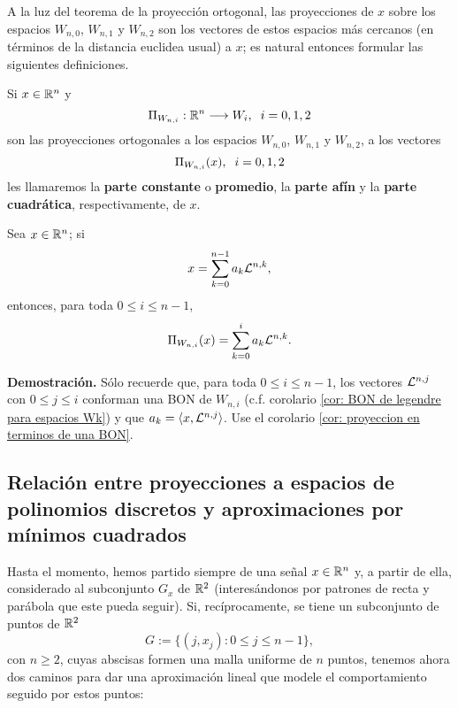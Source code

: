 \noindent A la luz del teorema de la proyección ortogonal, 
las proyecciones de $x$ sobre los espacios 
$W_{n,0}$, $W_{n,1}$
y $W_{n,2}$ son los vectores
de estos espacios más cercanos (en términos de la 
distancia euclidea usual)
a $x$; es natural entonces formular
las siguientes definiciones.


\begin{defi}
Si $x \in \mathbb{R}^{n}$ y
\begin{equation}
\label{eq0: 5Dic}
\Pi_{W_{n,i}}: \mathbb{R} ^{n}  \longrightarrow W_{i}, \hspace{0.2cm}
i=0,1,2
\end{equation}
son las proyecciones ortogonales
a los espacios 
$W_{n,0}$, $W_{n,1}$ y $W_{n,2}$, a los vectores
\[
\Pi_{W_{n,i}}(x), \hspace{0.2cm} i=0,1,2
\]
les llamaremos la \textbf{parte constante}
o \textbf{promedio}, la \textbf{parte afín} y la
\textbf{parte cuadrática}, respectivamente, de $x$.
\end{defi}

\begin{prop}
Sea $x \in \mathbb{R}^{n}$; si
\[
x= \sum\limits_{k=0}^{n-1}a_{k}\mathcal{L}^{n,k},
\]
entonces, para toda $0 \leq i \leq n-1$,
\[
\Pi_{W_{n,i}}(x)=\sum\limits_{k=0}^{i}a_{k}\mathcal{L}^{n,k}.
\]
\end{prop}
\textbf{Demostración.}
Sólo recuerde que, para toda $0 \leq i \leq n-1$,
los vectores $\mathcal{L}^{n, j}$ con $0 \leq j \leq i$
conforman una BON de $W_{n,i}$
(c.f. corolario \ref{cor: BON de legendre para espacios Wk}) y
que $a_{k}= \langle x, \mathcal{L}^{n,j} \rangle$.
Use el corolario \ref{cor: proyeccion en terminos de una BON}.
\QEDB 
\vspace{0.2cm}

\subsection{Relación entre proyecciones a espacios de polinomios discretos y aproximaciones por mínimos cuadrados}
\label{Relación entre proyecciones a espacios de polinomios discretos y aproximaciones por mínimos cuadrados}

Hasta el momento, hemos partido siempre
de una señal $x \in \mathbb{R}^{n}$
y, a partir de ella, considerado al subconjunto $G_{x}$ 
de $\mathbb{R}^{2}$ (interesándonos por patrones de 
recta y parábola que este pueda seguir).
Si, recíprocamente, se tiene un 
subconjunto de puntos de $\mathbb{R}^{2}$ 
\begin{equation}
\label{eq: Halloween!}
G:=\{(j, x_{j}): 0 \leq j \leq n-1 \},
\end{equation}
con $n \geq 2$,
cuyas abscisas formen una malla uniforme
de $n$ puntos, tenemos ahora dos caminos
para dar una aproximación lineal
que modele el comportamiento 
seguido por estos puntos:

